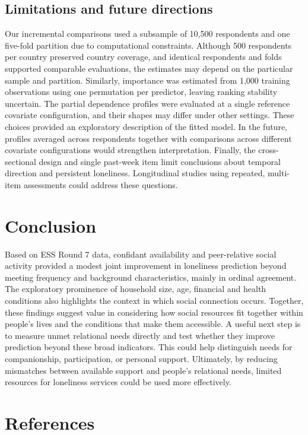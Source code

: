 \documentclass[12pt]{article}
\begin{document}
\subsection{Limitations and future directions}

Our incremental comparisons used a subsample of 10,500 respondents and one five-fold
partition due to computational constraints. Although 500 respondents per country
preserved country coverage, and identical respondents and folds supported comparable
evaluations, the estimates may depend on the particular sample and partition. Similarly,
importance was estimated from 1,000 training observations using one permutation per
predictor, leaving ranking stability uncertain. The partial dependence profiles were
evaluated at a single reference covariate configuration, and their shapes may differ
under other settings. These choices provided an exploratory description of the fitted
model. In the future, profiles averaged across respondents together with comparisons
across different covariate configurations would strengthen interpretation. Finally, the
cross-sectional design and single past-week item limit conclusions about temporal
direction and persistent loneliness. Longitudinal studies using repeated, multi-item
assessments could address these questions.

\section{Conclusion}

Based on ESS Round 7 data, confidant availability and peer-relative social activity
provided a modest joint improvement in loneliness prediction beyond meeting frequency
and background characteristics, mainly in ordinal agreement. The exploratory prominence
of household size, age, financial and health conditions also highlights the context in
which social connection occurs. Together, these findings suggest value in considering
how social resources fit together within people's lives and the conditions that make
them accessible. A useful next step is to measure unmet relational needs directly and
test whether they improve prediction beyond these broad indicators. This could help
distinguish needs for companionship, participation, or personal support. Ultimately, by
reducing mismatches between available support and people's relational needs, limited
resources for loneliness services could be used more effectively.

\newpage

\section{References}
\end{document}
